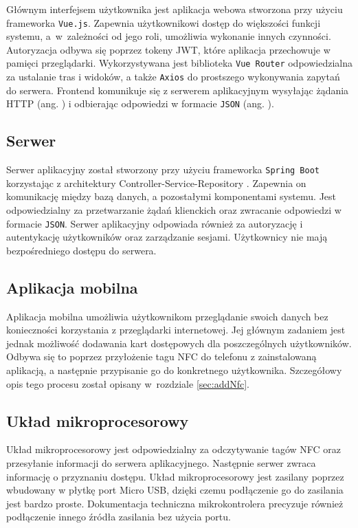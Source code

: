 Głównym interfejsem użytkownika jest aplikacja webowa stworzona przy użyciu frameworka \texttt{Vue.js}. Zapewnia użytkownikowi dostęp do większości funkcji systemu, a~w~zależności od jego roli, umożliwia wykonanie innych czynności. Autoryzacja odbywa się poprzez tokeny JWT, które aplikacja przechowuje w pamięci przeglądarki. Wykorzystywana jest biblioteka \texttt{Vue Router} odpowiedzialna za ustalanie tras i widoków, a także \texttt{Axios} do prostszego wykonywania zapytań do serwera. Frontend komunikuje się z serwerem aplikacyjnym wysyłając żądania HTTP (ang. ) i odbierając odpowiedzi w formacie \texttt{JSON} (ang. ).

\subsection{Serwer}

Serwer aplikacyjny został stworzony przy użyciu frameworka \texttt{Spring Boot} korzystając z architektury Controller-Service-Repository \cite{bib:ControllerServiceRepository}. Zapewnia on komunikację między bazą danych, a pozostałymi komponentami systemu. Jest odpowiedzialny za przetwarzanie żądań klienckich oraz zwracanie odpowiedzi w formacie \texttt{JSON}. Serwer aplikacyjny odpowiada również za autoryzację i autentykację użytkowników oraz zarządzanie sesjami. Użytkownicy nie mają bezpośredniego dostępu do serwera.

\subsection{Aplikacja mobilna}

Aplikacja mobilna umożliwia użytkownikom przeglądanie swoich danych bez konieczności korzystania z przeglądarki internetowej. Jej głównym zadaniem jest jednak możliwość dodawania kart dostępowych dla poszczególnych użytkowników. Odbywa się to poprzez przyłożenie tagu NFC do telefonu z zainstalowaną aplikacją, a następnie przypisanie go do konkretnego użytkownika. Szczegółowy opis tego procesu został opisany w~rozdziale \ref{sec:addNfc}.

\subsection{Układ mikroprocesorowy}

Układ mikroprocesorowy jest odpowiedzialny za odczytywanie tagów NFC oraz przesyłanie informacji do serwera aplikacyjnego. Następnie serwer zwraca informację o przyznaniu dostępu. Układ mikroprocesorowy jest zasilany poprzez wbudowany w płytkę port Micro USB, dzięki czemu podłączenie go do zasilania jest bardzo proste. Dokumentacja techniczna mikrokontrolera \cite{bib:picoWdatasheet} precyzuje również podłączenie innego źródła zasilania bez użycia portu.

